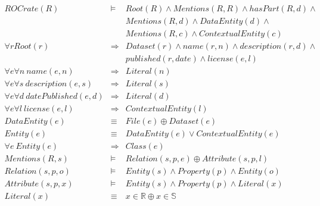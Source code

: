 \begin{eqnarray*}
ROCrate(R)                                 & \models & Root(R) \land Mentions(R, R) \land hasPart(R, d) \land \\
                                            & & Mentions(R, d) \land DataEntity(d) \land \\
                                            & & Mentions(R, c) \land ContextualEntity(c) \\
\forall r Root(r)                           & \Rightarrow & Dataset(r) \land name(r, n) \land description(r, d) \land \\
                                            & &             published(r, date) \land license(e, l) \\
\forall e \forall n \ name(e, n)            & \Rightarrow & Literal(n) \\
\forall e \forall s \ description(e, s)     & \Rightarrow & Literal(s) \\
\forall e \forall d \ datePublished(e, d)   & \Rightarrow & Literal(d) \\
\forall e \forall l \ license(e, l)         & \Rightarrow & ContextualEntity(l) \\
DataEntity(e)                               & \equiv &      File(e) \oplus Dataset(e) \\
Entity(e)                                   & \equiv &      DataEntity(e) \lor ContextualEntity(e) \\
\forall e \ Entity(e)                       & \Rightarrow & Class(e) \\
Mentions(R, s)                              & \models &     Relation(s, p, e) \oplus Attribute(s,  p, l) \\
Relation(s, p, o)                           & \models &     Entity(s) \land Property(p) \land  Entity(o) \\
Attribute(s, p, x)                          & \models &     Entity(s) \land Property(p) \land Literal(x) \\
Literal(x)                                  & \equiv &      x \in \mathbb{R} \oplus x \in \mathbb{S}
\end{eqnarray*}

